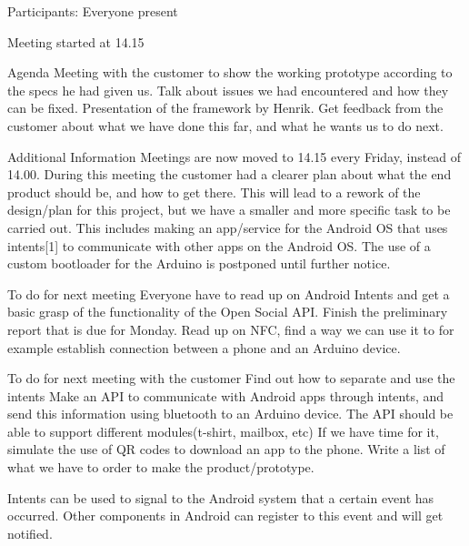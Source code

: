 Participants: Everyone present


Meeting started at 14.15


Agenda
Meeting with the customer to show the working prototype according to the specs he had given us.
Talk about issues we had encountered and how they can be fixed.
Presentation of the framework by Henrik.
Get feedback from the customer about what we have done this far, and what he wants us to do next.


Additional Information
Meetings are now moved to 14.15 every Friday, instead of 14.00.
During this meeting the customer had a clearer plan about what the end product should be, and how to get there. This will lead to a rework of the design/plan for this project, but we have a smaller and more specific task to be carried out. This includes making an app/service for the Android OS that uses intents[1] to communicate with other apps on the Android OS.
The use of a custom bootloader for the Arduino is postponed until further notice.




To do for next meeting
Everyone have to read up on Android Intents and get a basic grasp of the functionality of the Open Social API.
Finish the preliminary report that is due for Monday.
Read up on NFC, find a way we can use it to for example establish connection between a phone and an Arduino device.




To do for next meeting with the customer
Find out how to separate and use the intents
Make an API to communicate with Android apps through intents, and send this information using bluetooth to an Arduino device.
The API should be able to support different modules(t-shirt, mailbox, etc)
If we have time for it, simulate the use of QR codes to download an app to the phone.
Write a list of what we have to order to make the product/prototype.

Intents can be used to signal to the Android system that a certain event has occurred. Other components in Android can register to this event and will get notified.